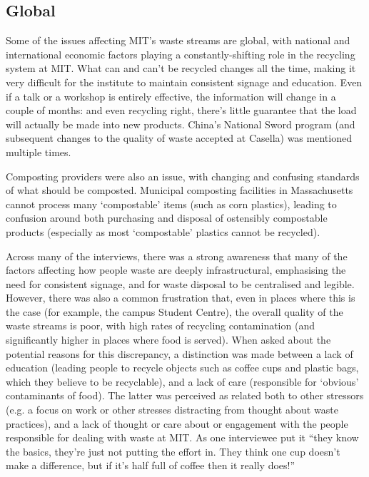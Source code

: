 \documentclass[nofonts,nols,justified,nobib]{tufte-book}
\begin{document}
\subsection*{Global}

Some of the issues affecting MIT's waste streams are global, with national and international economic factors playing a constantly-shifting role in the recycling system at MIT. What can and can't be recycled changes all the time, making it very difficult for the institute to maintain consistent signage and education. Even if a talk or a workshop is entirely effective, the information will change in a couple of months: and even recycling right, there's little guarantee that the load will actually be made into new products. China's National Sword program (and subsequent changes to the quality of waste accepted at Casella) was mentioned multiple times.

Composting providers were also an issue, with changing and confusing standards of what should be composted. Municipal composting facilities in Massachusetts cannot process many `compostable' items (such as corn plastics), leading to confusion around both purchasing and disposal of ostensibly compostable products (especially as most `compostable' plastics cannot be recycled).

Across many of the interviews, there was a strong awareness that many of the factors affecting how people waste are deeply infrastructural, emphasising the need for consistent signage, and for waste disposal to be centralised and legible. However, there was also a common frustration that, even in places where this is the case (for example, the campus Student Centre), the overall quality of the waste streams is poor, with high rates of recycling contamination (and significantly higher in places where food is served). When asked about the potential reasons for this discrepancy, a distinction was made between a lack of education (leading people to recycle objects such as coffee cups and plastic bags, which they believe to be recyclable), and a lack of care (responsible for `obvious' contaminants of food). The latter was perceived as related both to other stressors (e.g. a focus on work or other stresses distracting from thought about waste practices), and a lack of thought or care about or engagement with the people responsible for dealing with waste at MIT. As one interviewee put it ``they know the basics, they're just not putting the effort in. They think one cup doesn't make a difference, but if it's half full of coffee then it really does!''
\end{document}
